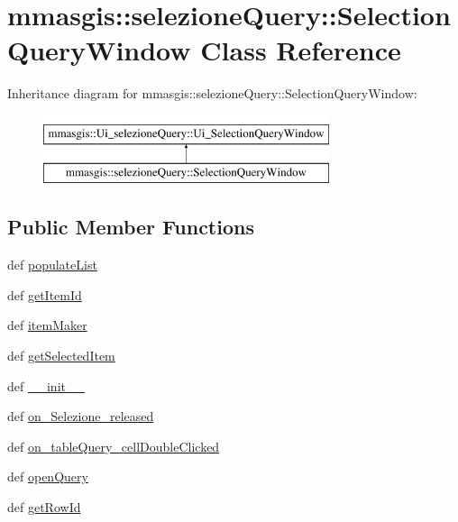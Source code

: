 \hypertarget{classmmasgis_1_1selezioneQuery_1_1SelectionQueryWindow}{
\section{mmasgis::selezioneQuery::SelectionQueryWindow Class Reference}
\label{classmmasgis_1_1selezioneQuery_1_1SelectionQueryWindow}
}
Inheritance diagram for mmasgis::selezioneQuery::SelectionQueryWindow:\begin{figure}[H]
\begin{center}
\leavevmode
\includegraphics[height=2.000000cm]{classmmasgis_1_1selezioneQuery_1_1SelectionQueryWindow}
\end{center}
\end{figure}
\subsection*{Public Member Functions}
\begin{DoxyCompactItemize}
\item 
def \hyperlink{classmmasgis_1_1selezioneQuery_1_1SelectionQueryWindow_a56a9df75c4bafe016bc7ac6212b1bc87}{populateList}
\item 
def \hyperlink{classmmasgis_1_1selezioneQuery_1_1SelectionQueryWindow_aaf2db74901214470abf5543b393c7e20}{getItemId}
\item 
def \hyperlink{classmmasgis_1_1selezioneQuery_1_1SelectionQueryWindow_a23a8a743ee8d1f5ee22a2b3058d0788a}{itemMaker}
\item 
def \hyperlink{classmmasgis_1_1selezioneQuery_1_1SelectionQueryWindow_a4bb4a4a7ad3fc587c731533ae3fdcae8}{getSelectedItem}
\item 
def \hyperlink{classmmasgis_1_1selezioneQuery_1_1SelectionQueryWindow_aeaa19acf2d01ea847b14fcd2fe5eacfb}{\_\-\_\-init\_\-\_\-}
\item 
def \hyperlink{classmmasgis_1_1selezioneQuery_1_1SelectionQueryWindow_a18c803377dfd59204abec6d27035d63e}{on\_\-Selezione\_\-released}
\item 
def \hyperlink{classmmasgis_1_1selezioneQuery_1_1SelectionQueryWindow_a685c746014f26bc515cb02c8c2b300ec}{on\_\-tableQuery\_\-cellDoubleClicked}
\item 
def \hyperlink{classmmasgis_1_1selezioneQuery_1_1SelectionQueryWindow_a1a653f4b4765d375c2bb93ce8e0613af}{openQuery}
\item 
def \hyperlink{classmmasgis_1_1selezioneQuery_1_1SelectionQueryWindow_a667c6b3bbd583395c56bf31f51f6cafb}{getRowId}
\end{DoxyCompactItemize}
